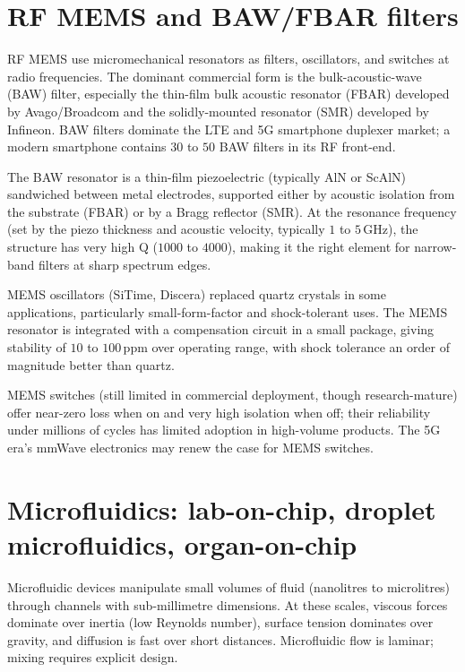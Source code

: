 \section{RF MEMS and BAW/FBAR filters}

RF MEMS use micromechanical resonators as filters, oscillators, and switches at radio frequencies. The dominant commercial form is the bulk-acoustic-wave (BAW) filter, especially the thin-film bulk acoustic resonator (FBAR) developed by Avago/Broadcom and the solidly-mounted resonator (SMR) developed by Infineon. BAW filters dominate the LTE and 5G smartphone duplexer market; a modern smartphone contains $30$ to $50$ BAW filters in its RF front-end.

The BAW resonator is a thin-film piezoelectric (typically AlN or ScAlN) sandwiched between metal electrodes, supported either by acoustic isolation from the substrate (FBAR) or by a Bragg reflector (SMR). At the resonance frequency (set by the piezo thickness and acoustic velocity, typically $1$ to $5\,\text{GHz}$), the structure has very high Q ($1000$ to $4000$), making it the right element for narrow-band filters at sharp spectrum edges.

MEMS oscillators (SiTime, Discera) replaced quartz crystals in some applications, particularly small-form-factor and shock-tolerant uses. The MEMS resonator is integrated with a compensation circuit in a small package, giving stability of $10$ to $100\,\text{ppm}$ over operating range, with shock tolerance an order of magnitude better than quartz.

MEMS switches (still limited in commercial deployment, though research-mature) offer near-zero loss when on and very high isolation when off; their reliability under millions of cycles has limited adoption in high-volume products. The 5G era's mmWave electronics may renew the case for MEMS switches.

\section{Microfluidics: lab-on-chip, droplet microfluidics, organ-on-chip}

Microfluidic devices manipulate small volumes of fluid (nanolitres to microlitres) through channels with sub-millimetre dimensions. At these scales, viscous forces dominate over inertia (low Reynolds number), surface tension dominates over gravity, and diffusion is fast over short distances. Microfluidic flow is laminar; mixing requires explicit design.

